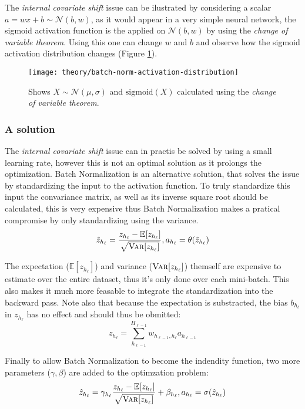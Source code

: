The \textit{internal covariate shift} issue can be ilustrated by considering a scalar $a = w x + b \sim \mathcal{N}(b, w)$, as it would appear in a very simple neural network, the sigmoid activation function is the applied on $\mathcal{N}(b, w)$ by using the \textit{change of variable theorem}. Using this one can change $w$ and $b$ and observe how the sigmoid activation distribution changes (Figure \ref{fig:convergence:batch-norm:activation-distribution}).

\begin{figure}[h]
	\centering
	\texttt{[image: theory/batch-norm-activation-distribution]}
	\caption{Shows $X \sim \mathcal{N}(\mu, \sigma)$ and $\mathrm{sigmoid}(X)$ calculated using the \textit{change of variable theorem}.}
	\label{fig:convergence:batch-norm:activation-distribution}
\end{figure}

\subsubsection{A solution}
The \textit{internal covariate shift} issue can in practis be solved by using a small learning rate, however this is not an optimal solution as it prolongs the optimization. Batch Normalization is an alternative solution, that solves the issue by standardizing the input to the activation function. To truly standardize this input the convariance matrix, as well as its inverse square root should be calculated, this is very expensive thus Batch Normalization makes a pratical compromise by only standardizing using the variance.
\begin{equation}
\hat{z}_{h_\ell} = \frac{z_{h_\ell} - \mathbb{E}[z_{h_\ell}]}{\sqrt{\textsc{Var}[z_{h_\ell}]}}, a_{h_\ell} = \theta(\hat{z}_{h_\ell})
\end{equation}

The expectation ($\mathbb{E}[z_{h_\ell}]$) and variance ($\textsc{Var}[z_{h_\ell}]$) themself are expensive to estimate over the entire dataset, thus it's only done over each mini-batch. This also makes it much more feasable to integrate the standardization into the backward pass. Note also that because the expectation is substracted, the bias $b_{h_\ell}$ in $z_{h_\ell}$ has no effect and should thus be obmitted:
\begin{equation}
z_{h_\ell} = \sum_{h_{\ell-1}}^{H_{\ell-1}} w_{h_{\ell-1}, h_\ell} a_{h_{\ell-1}} 
\end{equation}


Finally to allow Batch Normalization to become the indendity function, two more parameters ($\gamma, \beta$) are added to the optimzation problem:
\begin{equation}
\hat{z}_{h_\ell} = \gamma_{h_\ell} \frac{z_{h_\ell} - \mathbb{E}[z_{h_\ell}]}{\sqrt{\textsc{Var}[z_{h_\ell}]}} + \beta_{h_\ell}, a_{h_\ell} = \sigma(\hat{z}_{h_\ell})
\label{eq:theory:convergence:batch-norm}
\end{equation}

